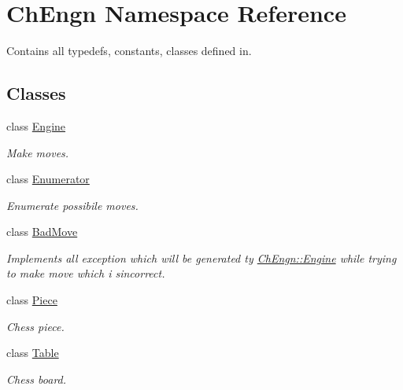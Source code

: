\hypertarget{namespaceChEngn}{
\section{ChEngn Namespace Reference}
\label{namespaceChEngn}
}


Contains all typedefs, constants, classes defined in.  


\subsection*{Classes}
\begin{DoxyCompactItemize}
\item 
class \hyperlink{classChEngn_1_1Engine}{Engine}
\begin{DoxyCompactList}\small\item\em Make moves. \item\end{DoxyCompactList}\item 
class \hyperlink{classChEngn_1_1Enumerator}{Enumerator}
\begin{DoxyCompactList}\small\item\em Enumerate possibile moves. \item\end{DoxyCompactList}\item 
class \hyperlink{classChEngn_1_1BadMove}{BadMove}
\begin{DoxyCompactList}\small\item\em Implements all exception which will be generated ty \hyperlink{classChEngn_1_1Engine}{ChEngn::Engine} while trying to make move which i sincorrect. \item\end{DoxyCompactList}\item 
class \hyperlink{classChEngn_1_1Piece}{Piece}
\begin{DoxyCompactList}\small\item\em Chess piece. \item\end{DoxyCompactList}\item 
class \hyperlink{classChEngn_1_1Table}{Table}
\begin{DoxyCompactList}\small\item\em Chess board. \item\end{DoxyCompactList}\end{DoxyCompactItemize}
